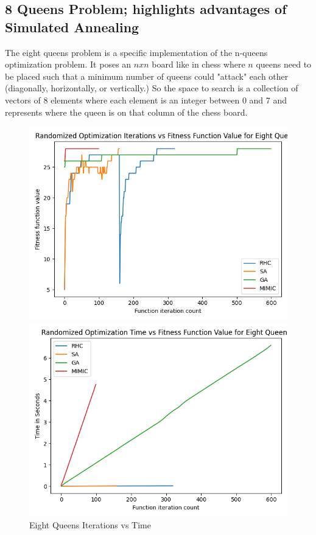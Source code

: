 \documentclass[11pt]{article}
\newcommand{\problemtwo}{8 Queens Problem}
\begin{document}
    \subsection{\problemtwo \hspace{0em}; highlights advantages of Simulated Annealing}
    The eight queens problem is a specific implementation of the n-queens optimization problem.\cite{Russel10} It poses
    an $n x n$ board like in chess where $n$ queens need to be placed such that a minimum number of queens could "attack"
    each other (diagonally, horizontally, or vertically.) So the space to search is a collection of vectors of 8 elements
    where each element is an integer between 0 and 7 and represents where the queen is on that column of the chess board.
    \begin{figure}
        \begin{minipage}{0.5\textwidth}
            \centering
            \includegraphics[width=0.9\linewidth]{eightqueens1.png}
            \caption{Eight Queens Iterations vs Fitness Function Value}\label{Fig:Eight Queens Iterations vs Fitness Function Value}
        \end{minipage}\hfill
        \begin{minipage}{0.5\textwidth}
            \centering
            \includegraphics[width=0.9\linewidth]{eightqueens2.png}
            \caption{Eight Queens Iterations vs Time}\label{Fig:Eight Queens Iterations vs Time}
        \end{minipage}
    \end{figure}
\end{document}
